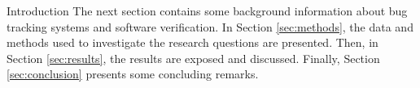 \begin{section}{Introduction}
	The next section contains some background information about bug tracking systems and software verification. In Section \ref{sec:methods}, the data and methods used to investigate the research questions are presented. Then, in Section \ref{sec:results}, the results are exposed and discussed. Finally, Section \ref{sec:conclusion} presents some concluding remarks.




\end{section}

